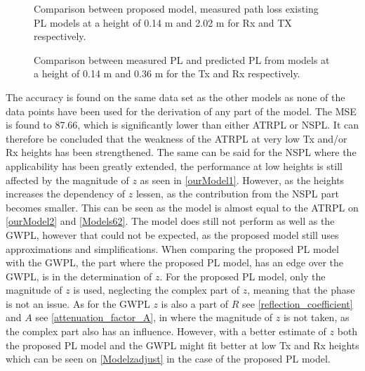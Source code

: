 \begin{figure}[H]
\centering

\caption{Comparison between proposed model, measured path loss existing PL models at a height of 0.14 m and 2.02 m for Rx and TX respectively.}
\label{ourModel2}
\end{figure}

\begin{figure}[H]
\centering

\caption{Comparison between measured PL and predicted PL from models at a height of 0.14 m and 0.36 m for the Tx and Rx respectively.}
\label{Models62}
\end{figure}


The accuracy is found on the same data set as the other models as none of the data points have been used for the derivation of any part of the model. The MSE is found to 87.66, which is significantly lower than either ATRPL or NSPL. It can therefore be concluded that the weakness of the ATRPL at very low Tx and/or Rx heights has been strengthened. The same can be said for the NSPL where the applicability has been greatly extended, the performance at low heights is still affected by the magnitude of $z$ as seen in \autoref{ourModel1}. However, as the heights increases the dependency of $z$ lessen, as the contribution from the NSPL part becomes smaller. This can be seen as the model is almost equal to the ATRPL on \autoref{ourModel2} and \autoref{Models62}.  The model does still not perform as well as the GWPL, however that could not be expected, as the proposed model still uses approximations and simplifications. When comparing the proposed PL model with the GWPL, the part where the proposed PL model, has an edge over the GWPL, is in the determination of $z$. For the proposed PL model, only the magnitude of $z$ is used, neglecting the complex part of $z$, meaning that the phase is not an issue. As for the GWPL $z$ is also a part of $R$ see \eqref{reflection_coefficient} and $A$ see \eqref{attenuation_factor_A}, in where the magnitude of $z$ is not taken, as the complex part also has an influence. However, with a better estimate of $z$ both the proposed PL model and the GWPL might fit better at low Tx and Rx heights which can be seen on \autoref{Modelzadjust} in the case of the proposed PL model. 


